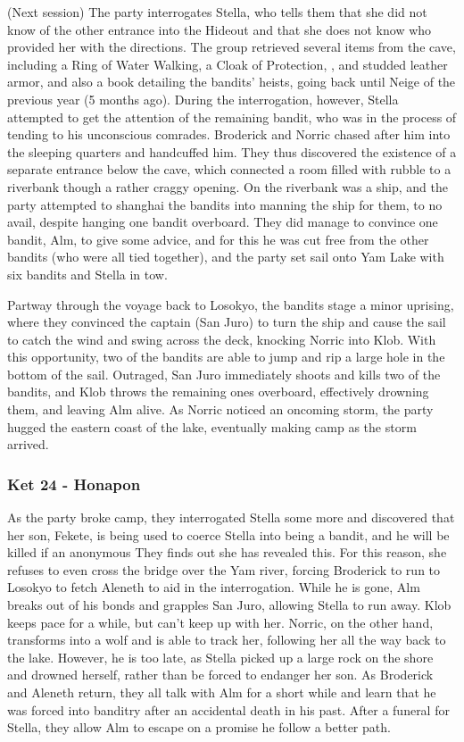 (Next session)
The party interrogates Stella, who tells them that she did not know of the other entrance into the Hideout and that she does not know who provided her with the directions. The group retrieved several items from the cave, including a Ring of Water Walking, a Cloak of Protection, , and studded leather armor, and also a book detailing the bandits' heists, going back until Neige of the previous year (5 months ago). During the interrogation, however, Stella attempted to get the attention of the remaining bandit, who was in the process of tending to his unconscious comrades. Broderick and Norric chased after him into the sleeping quarters and handcuffed him. They thus discovered the existence of a separate entrance below the cave, which connected a room filled with rubble to a riverbank though a rather craggy opening. On the riverbank was a ship, and the party attempted to shanghai the bandits into manning the ship for them, to no avail, despite hanging one bandit overboard. They did manage to convince one bandit, Alm, to give some advice, and for this he was cut free from the other bandits (who were all tied together), and the party set sail onto Yam Lake with six bandits and Stella in tow. 

Partway through the voyage back to Losokyo, the bandits stage a minor uprising, where they convinced the captain (San Juro) to turn the ship and cause the sail to catch the wind and swing across the deck, knocking Norric into Klob. With this opportunity, two of the bandits are able to jump and rip a large hole in the bottom of the sail. Outraged, San Juro immediately shoots and kills two of the bandits, and Klob throws the remaining ones overboard, effectively drowning them, and leaving Alm alive. As Norric noticed an oncoming storm, the party hugged the eastern coast of the lake, eventually making camp as the storm arrived. 

\subsubsection{Ket 24 - Honapon}
As the party broke camp, they interrogated Stella some more and discovered that her son, Fekete, is being used to coerce Stella into being a bandit, and he will be killed if an anonymous They finds out she has revealed this. For this reason, she refuses to even cross the bridge over the Yam river, forcing Broderick to run to Losokyo to fetch Aleneth to aid in the interrogation. While he is gone, Alm breaks out of his bonds and grapples San Juro, allowing Stella to run away. Klob keeps pace for a while, but can't keep up with her. Norric, on the other hand, transforms into a wolf and is able to track her, following her all the way back to the lake. However, he is too late, as Stella picked up a large rock on the shore and drowned herself, rather than be forced to endanger her son. As Broderick and Aleneth return, they all talk with Alm for a short while and learn that he was forced into banditry after an accidental death in his past. After a funeral for Stella, they allow Alm to escape on a promise he follow a better path.

